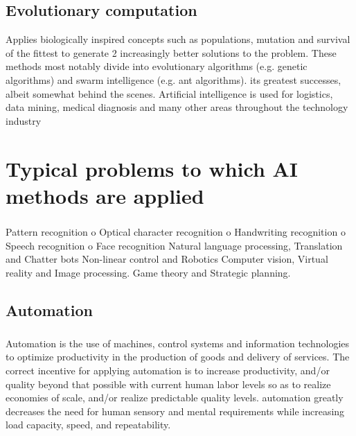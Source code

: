 \documentclass[12pt]{report}
\begin{document}
\section{Evolutionary computation} 
\par Applies biologically
inspired concepts such as populations, mutation and survival of the fittest to generate 2
increasingly better solutions to the problem. These methods most notably divide into evolutionary
algorithms (e.g. genetic algorithms) and swarm intelligence (e.g. ant algorithms). its greatest
successes, albeit somewhat behind the scenes. Artificial intelligence is used for logistics, data
mining, medical diagnosis and many other areas throughout the technology industry
 
\newpage
\chapter{Typical problems to which AI methods are applied}
\paragraph{} Pattern recognition o Optical character recognition o Handwriting recognition o Speech
recognition o Face recognition Natural language processing, Translation and Chatter bots
Non-linear control and Robotics Computer vision, Virtual reality and Image processing. Game
theory and Strategic planning.
\section{Automation}
\paragraph{} Automation is the use of machines, control systems and information technologies to
optimize productivity in the production of goods and delivery of services. The correct incentive
for applying automation is to increase productivity, and/or quality beyond that possible with
current human labor levels so as to realize economies of scale, and/or realize predictable quality
levels. automation greatly decreases the need for human sensory and mental requirements while
increasing load capacity, speed, and repeatability.
\end{document}
